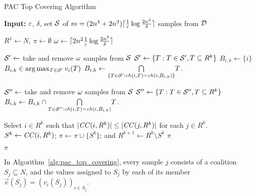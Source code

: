 \begin{algorithm}[htb]
  \caption{PAC Top Covering Algorithm}
  \label{alg:pac_top_covering}
  \textbf{Input:} $\eps$, $\delta$, set $\cal S$ of $m = (2n^4 + 2n^3)\ceil{\frac{1}{\eps}\log\frac{2n^3}{\delta}}$ samples from $\cal D$
  \begin{algorithmic}[1]

  \State $R^1 \gets N$, $\pi \gets \emptyset$
  \State $\samples \gets \ceil{2n^2 \frac{1}{\eps}\log\frac{2n^3}{\delta}}$

    \State \label{pac_top_cover:sample_begin} $\cal S' \gets$ take and remove $\samples$ samples from $\cal S$
    \State $\cal S' \gets \{T: T \in \cal S', T \subseteq R^k\}$
        \State$B_{i,k} \gets \{i\}$
      \Else
        \State $B_{i,k} \in \arg\max_{T \in \cal S'}{v_i(T)}$
        \State $B_{i,k} \gets \underset{\{T \in \cal S' : \ch(i,T) = \ch(i,B_{i,k})\}}{\bigcap} T$.
      \EndIf
    \EndFor

      \State $\cal S'' \gets$ take and remove $\samples$ samples from $\cal S$
      \State $\cal S'' \gets \{T: T \in \cal S'', T \subseteq R^k\}$
        \State $B_{i,k} \gets B_{i,k} \cap \underset{T \in \cal S'' : \ch(i,T) = \ch(i,B_{i,k})}{\bigcap} T$.
      \EndFor
    \EndFor \label{pac_top_cover:sample_end}

    \State Select $i\in R^k$ such that $|\CC(i,R^k)| \leq |\CC(j,R^k)|$ for each $j\in R^k$.
    \State $S^k\leftarrow  \CC(i,R^k)$; $\pi \leftarrow  \pi \cup \lbrace S^k \rbrace$;  and $R^{k+1} \leftarrow  R^k \setminus S^k$
      \State \Return $\pi$
    \EndIf
  \EndFor

  \State \Return $\pi$
 \end{algorithmic}
\end{algorithm}

In Algorithm~\ref{alg:pac_top_covering}, every sample $j$ consists of a coalition $S_j \subseteq N$, and the values assigned to $S_j$ by each of its member $\vec{v}(S_j) = (v_i(S_j))_{i \in S_j}$.
